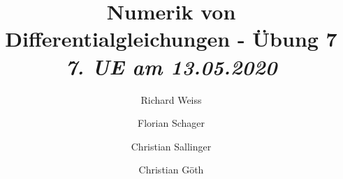 \documentclass{article}
\title
{
  Numerik von Differentialgleichungen - Übung 7 \\
  \vspace{4pt}
  \normalsize
  \textit{7. UE am 13.05.2020}
}
\author
{
  Richard Weiss       \and
  Florian Schager     \and
  Christian Sallinger \and
  Christian Göth
}
\date{}
\begin{document}
\renewcommand{\figurename}{Abbildung}
\maketitle






\end{document}
